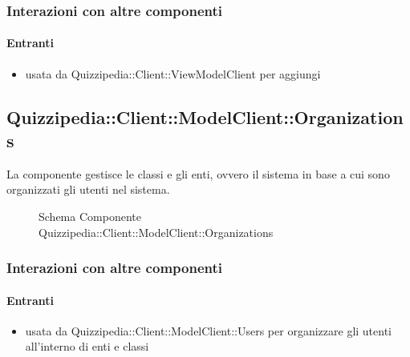 \subsubsection{Interazioni con altre componenti}
\paragraph{Entranti}
\begin{itemize}
\item usata da Quizzipedia::Client::ViewModelClient per aggiungi
\end{itemize}
\subsection{Quizzipedia::Client::ModelClient::Organizations}
La componente gestisce le classi e gli enti, ovvero il sistema in base a cui sono organizzati gli utenti nel sistema.
\begin{figure}[H]
\centering
\noindent{}
\caption[Schema Componente Quizzipedia::Client::ModelClient::Organizations]{Schema Componente Quizzipedia::Client::ModelClient::Organizations}
\end{figure}
\subsubsection{Interazioni con altre componenti}
\paragraph{Entranti}
\begin{itemize}
\item usata da Quizzipedia::Client::ModelClient::Users per organizzare gli utenti all'interno di enti e classi
\end{itemize}
